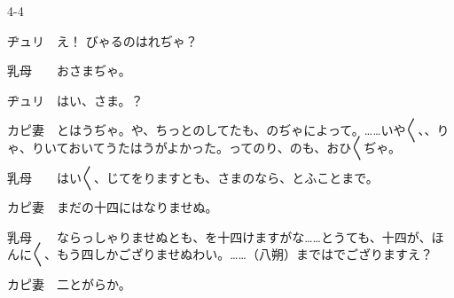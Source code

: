 \documentclass[tate,paper=b6j,jafontsize=9pt]{jlreq}
\begin{document}
\begin{azconvIndented}{4\zw}{-4\zw}

ヂュリ　え！ びゃるのはれぢゃ？

乳母　　おさまぢゃ。

ヂュリ　はい、さま。？

カピ妻　とはうぢゃ。や、ちっとのしてたも、のぢゃによって。……いや{〳〵}、、りゃ、りいておいてうたはうがよかった。ってのり、のも、おひ{〳〵}ぢゃ。

乳母　　はい{〳〵}、じてをりますとも、さまのなら、とふことまで。

カピ妻　まだの十四にはなりませぬ。

乳母　　ならっしゃりませぬとも、を十四けますがな……とうても、十四が、ほんに{〳〵}、もう四しかござりませぬわい。……（八朔）まではでござりますえ？

カピ妻　二とがらか。


\end{azconvIndented}
\end{document}
